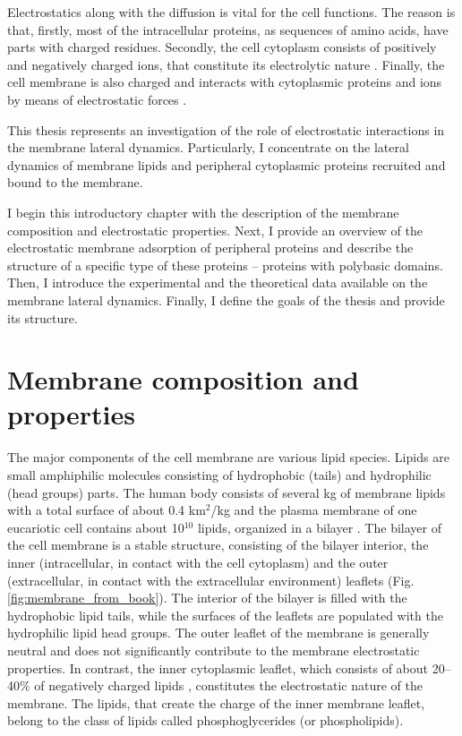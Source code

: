 Electrostatics along with the diffusion is vital for the cell functions. The reason is that, firstly, most of the intracellular proteins, as sequences of amino acids, have parts with charged residues. Secondly, the cell cytoplasm consists of positively and negatively charged ions, that constitute its electrolytic nature \cite{Voets1999}. Finally, the cell membrane is also charged and interacts with cytoplasmic proteins and ions by means of electrostatic forces \cite{McLaughlin2005a}.

This thesis represents an investigation of the role of electrostatic interactions in the membrane lateral dynamics. Particularly, I concentrate on the lateral dynamics of membrane lipids and peripheral cytoplasmic proteins recruited and bound to the membrane.

I begin this introductory chapter with the description of the membrane composition and electrostatic properties. Next, I provide an overview of the electrostatic membrane adsorption of peripheral proteins and describe the structure of a specific type of these proteins -- proteins with polybasic domains. Then, I introduce the experimental and the theoretical data available on the membrane lateral dynamics. Finally, I define the goals of the thesis and provide its structure.

\section{Membrane composition and properties}

The major components of the cell membrane are various lipid species. Lipids are small amphiphilic molecules consisting of hydrophobic (tails) and hydrophilic (head groups) parts. The human body consists of several kg of membrane lipids with a total surface of about 0.4 km$^2$/kg and the plasma membrane of one eucariotic cell contains about 10$^{10}$ lipids, organized in a bilayer \cite{Heimburg2007}. The bilayer of the cell membrane is a stable structure, consisting of the bilayer interior, the inner (intracellular, in contact with the cell cytoplasm) and the outer (extracellular, in contact with the extracellular environment) leaflets (Fig. \ref{fig:membrane_from_book}). The interior of the bilayer is filled with the hydrophobic lipid tails, while the surfaces of the leaflets are populated with the hydrophilic lipid head groups. The outer leaflet of the membrane is generally neutral and does not significantly contribute to the membrane electrostatic properties. In contrast, the inner cytoplasmic leaflet, which consists of about 20--40\% of negatively charged lipids \cite{Kiessling2009}, constitutes the electrostatic nature of the membrane. The lipids, that create the charge of the inner membrane leaflet, belong to the class of lipids called phosphoglycerides (or phospholipids).

